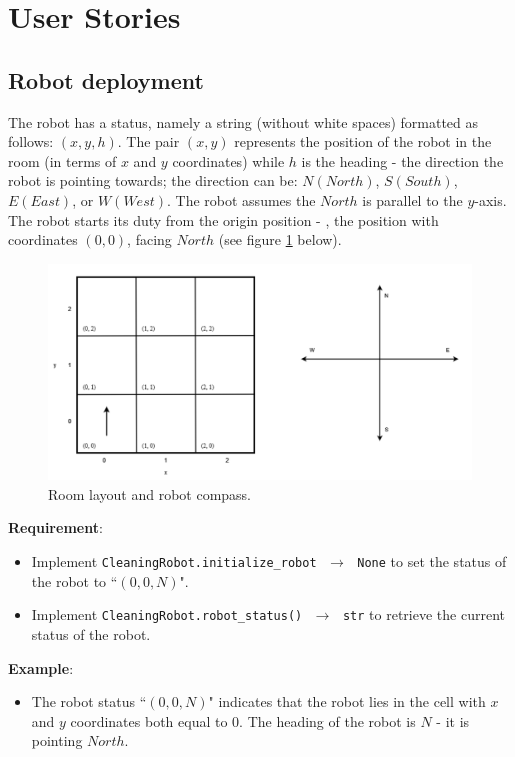\section{User Stories}
\subsection{Robot deployment}
The robot has a status, namely a string (without white spaces) formatted as follows: $(x,y,h)$. The pair $(x,y)$ represents the position of the robot in the room (in terms of $x$ and $y$ coordinates) while $h$ is the heading - \ie the direction the robot is pointing towards; the direction can be: $N (North)$, $S (South)$, $E (East)$, or $W (West)$. The robot assumes the $North$ is parallel to the $y$-axis. The robot starts its duty from the origin position - \ie, the position with coordinates $(0,0)$, facing $North$ (see figure \ref{room_and_compass} below).

\begin{figure}[H]
    \centering
    \includegraphics[width=\linewidth]{figures/appendix/cleaning_robot_1.png}
    \caption{Room layout and robot compass.}
    \label{room_and_compass}
\end{figure}

\noindent\textbf{Requirement}:
\begin{itemize}
    \item Implement \texttt{CleaningRobot.initialize\_robot $\,\to\,$ None} to set the status of the robot to ``$(0,0,N)$".
    \item Implement \texttt{CleaningRobot.robot\_status()  $\,\to\,$ str} to retrieve the current status of the robot.
\end{itemize}

\noindent\textbf{Example}:
\begin{itemize}
    \item The robot status ``$(0,0,N)$" indicates that the robot lies in the cell with $x$ and $y$ coordinates both equal to 0. The heading of the robot is $N$ - \ie it is pointing $North$.
\end{itemize}


